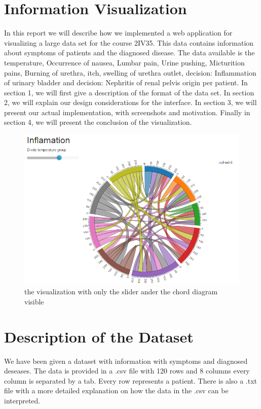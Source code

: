\documentclass[a4paper,twoside,11pt]{article}
\begin{document}
\section*{Information Visualization}
In this report we will describe how we implemented a web application for visualizing a large data set for the course 2IV35. This data contains information about symptoms of patients and the diagnosed disease. \newline
The data available is the temperature, Occurrence of nausea, Lumbar pain, Urine pushing, Micturition pains, Burning of urethra, itch, swelling of urethra outlet, decision: Inflammation of urinary bladder and decision: Nephritis of renal pelvis origin per patient. \newline
In section 1, we will first give a description of the format of the data set. \newline
In section 2, we will explain our design considerations for the interface. \newline
In section 3, we will present our actual implementation, with screenshots and motivation. \newline
Finally in section 4, we will present the conclusion of the visualization.
\begin{figure}[h]
    \includegraphics[width=\textwidth]{images/chordDiagram.PNG}
    \caption{the visualization with only the slider ander the chord diagram visible}
    \label{fig:overView}
\end{figure}
\newpage
\section{Description of the Dataset}
We have been given a dataset with information with symptoms and diagnosed deseases. The data is provided in a .csv file with 120 rows and 8 columns every column is separated by a tab. Every row represents a patient. There is also a .txt file with a more detailed explanation on how the data in the .csv can be interpreted.
\end{document}
